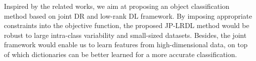 \documentclass[journal]{IEEEtran}
\begin{document}
Inspired by the related works, we aim at proposing an object classification method based on joint DR and low-rank DL framework. By imposing appropriate constraints into the objective function, the proposed JP-LRDL method would be robust to large intra-class variability and small-sized datasets. Besides, the joint framework would enable us to learn features from high-dimensional data, on top of which dictionaries can be better learned for a more accurate classification.
\end{document}
